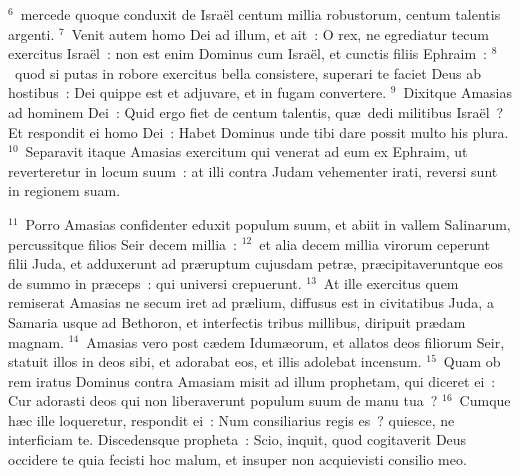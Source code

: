 ${}^{6}$~mercede quoque conduxit de Isra\"el centum millia robustorum, centum talentis argenti.
${}^{7}$~Venit autem homo Dei ad illum, et ait~: O rex, ne egrediatur tecum exercitus Isra\"el~: non est enim Dominus cum Isra\"el, et cunctis filiis Ephraim~:
${}^{8}$~quod si putas in robore exercitus bella consistere, superari te faciet Deus ab hostibus~: Dei quippe est et adjuvare, et in fugam convertere.
${}^{9}$~Dixitque Amasias ad hominem Dei~: Quid ergo fiet de centum talentis, qu\ae\ dedi militibus Isra\"el~? Et respondit ei homo Dei~: Habet Dominus unde tibi dare possit multo his plura.
${}^{10}$~Separavit itaque Amasias exercitum qui venerat ad eum ex Ephraim, ut reverteretur in locum suum~: at illi contra Judam vehementer irati, reversi sunt in regionem suam.


${}^{11}$~Porro Amasias confidenter eduxit populum suum, et abiit in vallem Salinarum, percussitque filios Seir decem millia~:
${}^{12}$~et alia decem millia virorum ceperunt filii Juda, et adduxerunt ad pr\ae ruptum cujusdam petr\ae , pr\ae cipitaveruntque eos de summo in pr\ae ceps~: qui universi crepuerunt.
${}^{13}$~At ille exercitus quem remiserat Amasias ne secum iret ad pr\ae lium, diffusus est in civitatibus Juda, a Samaria usque ad Bethoron, et interfectis tribus millibus, diripuit pr\ae dam magnam.
${}^{14}$~Amasias vero post c\ae dem Idum\ae orum, et allatos deos filiorum Seir, statuit illos in deos sibi, et adorabat eos, et illis adolebat incensum.
${}^{15}$~Quam ob rem iratus Dominus contra Amasiam misit ad illum prophetam, qui diceret ei~: Cur adorasti deos qui non liberaverunt populum suum de manu tua~?
${}^{16}$~Cumque h\ae c ille loqueretur, respondit ei~: Num consiliarius regis es~? quiesce, ne interficiam te. Discedensque propheta~: Scio, inquit, quod cogitaverit Deus occidere te quia fecisti hoc malum, et insuper non acquievisti consilio meo.


